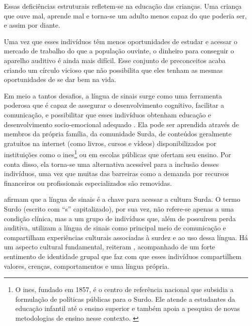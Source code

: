 \begin{citacao}
    Essas deficiências estruturais refletem-se na educação das crianças. Uma criança que ouve mal, aprende mal e torna-se um adulto menos capaz do que poderia ser, e assim por diante.~\cite{ebc-2021-oms-estima}
\end{citacao}

\begin{citacao}
    Uma vez que esses indivíduos têm menos oportunidades de estudar e acessar o mercado de trabalho do que a população ouvinte, o dinheiro para conseguir o aparelho auditivo é ainda mais difícil. Esse conjunto de preconceitos acaba criando um círculo vicioso que não possibilita que eles tenham as mesmas oportunidades de se dar bem na vida.~\cite{ebc-2019-10-milhoes-pessoas}
\end{citacao}


Em meio a tantos desafios, a língua de sinais surge como uma ferramenta poderosa que é capaz de assegurar o desenvolvimento cognitivo, facilitar a comunicação, e possibilitar que esses indivíduos obtenham educação e desenvolvimento socio-emocional adequado \cite{who-2021-report-hearing}.
Ela pode ser aprendida através de membros da própria família, da comunidade Surda, de conteúdos geralmente gratuitos na internet (como livros, cursos e vídeos) disponibilizados por instituições como o \acrshort{ines}\footnote{
    O \acrfull{ines}, fundado em 1857, é o centro de referência nacional que subsidia a formulação de políticas públicas para o Surdo. Ele atende a estudantes da educação infantil até o ensino superior e também apoia a pesquisa de novas metodologias de ensino nesse contexto. \cite{mec-2021-conheca-ines}
} ou em escolas públicas que ofertam seu ensino.
Por conta disso, ela torna-se uma alternativa acessível para a inclusão desses indivíduos, uma vez que muitas das barreiras como a demanda por recursos financeiros ou profissionais especializados são removidas.


 afirmam que a língua de sinais é a chave para acessar a cultura Surda.
O termo Surdo (escrito com ``s'' capitalizado), por sua vez, não refere-se apenas a uma condição clínica, mas a um grupo de indivíduos que, além de possuírem perda auditiva, utilizam a língua de sinais como principal meio de comunicação e compartilham experiências culturais associadas à surdez e ao uso dessa língua.
Há um aspecto cultural fundamental, reiteram , acompanhado de um forte sentimento de identidade grupal que faz com que esses indivíduos compartilhem valores, crenças, comportamentos e uma língua própria.


